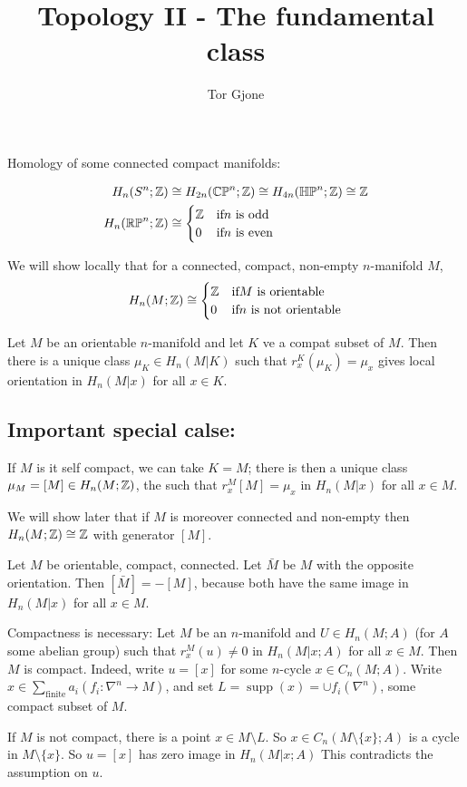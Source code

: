 \documentclass[a4paper,11pt,english]{article}
\title{\textbf{Topology II - The fundamental class}}
\author{Tor Gjone}
\newcommand{\bM}{\bar{M}}
\DeclareMathOperator{\supp}{supp}
\begin{document}
\mmaketitle


Homology of some connected compact manifolds: 

\begin{align*}
H_n(S^n;\mathbb{Z}) &\cong H_{2n}(\mathbb{CP}^n; \mathbb{Z}) \cong H_{4n}(\mathbb{HP}^n;\mathbb{Z}) \cong \mathbb{Z} \\
H_n(\mathbb{RP}^n; \mathbb{Z}) &\cong \begin{cases} \mathbb{Z} &\text{if} n \text{ is odd} \\ 0 &\text{if} n \text{ is even} \end{cases}
\end{align*}

We will show locally that for a connected, compact, non-empty $n$-manifold
$M$, 
\[ H_n(M; \mathbb{Z}) \cong \begin{cases} \mathbb{Z} &\text{if} M \text{ is orientable} \\ 0 &\text{if} n
\text{ is not orientable} \end{cases} \]

\begin{thrm}
Let $M$ be an orientable $n$-manifold and let $K$ ve a compat subset of
$M$. Then there is a unique class $\mu_K \in H_n(M|K)$ such that
$r^K_x(\mu_K) = \mu_x$ gives local orientation in $H_n(M|x)$ for all $x\in K$. 
\end{thrm}

\subsection{Important special calse:} 
If $M$ is it self compact, we can take $K = M$; there is then a unique class
$\mu_M = [M] \in H_n(M;\mathbb{Z})$, the  such that
$r^M_x[M] = \mu_x$ in $H_n(M|x)$ for all $x\in M$.

We will show later that if $M$ is moreover connected and non-empty then
$H_n(M; \mathbb{Z}) \cong \mathbb{Z}$ with generator $[M]$.


\begin{remark}
Let $M$ be orientable, compact, connected. Let $\bar{M}$ be $M$ with the
opposite orientation. Then $[\bM] = -[M]$, because both have the same image in
$H_n(M|x)$ for all $x \in M$.
\end{remark}

\begin{remark}
Compactness is necessary: Let $M$ be an $n$-manifold and $U \in H_n(M; A)$
(for $A$ some abelian group) such that $r^M_x(u) \ne 0$ in $H_n(M|x;A)$ for all
$x \in M$. Then $M$ is compact. Indeed, write $u = [x]$ for some $n$-cycle $x
\in C_n(M;A)$. Write $x \in \sum_{\text{finite}} a_i (f_i : \nabla^n \to M)$,
and set $L = \supp(x) = \cup f_i(\nabla^n)$, some compact subset of $M$. 

If $M$ is not compact, there is a point $x \in M \setminus L$. So $x \in
C_n(M \setminus \{ x \}; A)$ is a cycle in $M \setminus \{ x \}$. So $u = [x]$
has zero image in $H_n(M|x;A)$ This contradicts the assumption on $u$.
\end{remark}
\end{document}
